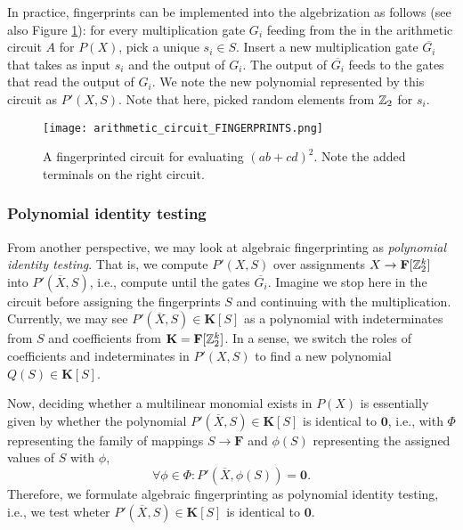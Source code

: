 In practice, fingerprints can be implemented 
into the algebrization as follows (see also Figure \ref{fig:circuit_fingerprints}): 
for every multiplication gate $G_i$ feeding from the
 in the arithmetic circuit $A$ for $P(X)$, 
pick a unique $s_i \in S$. Insert a new multiplication gate $\overbar{G_i}$ that takes 
as input $s_i$ and the output of $G_i$. The output of $\overbar{G_i}$ feeds to the 
gates that read the output of $G_i$. We note the new polynomial represented by this circuit 
as $P'(X, S)$. Note that here, 
\citeauthor{Koutis08} picked random elements from $\mathbb Z_2$ for $s_i$.

\begin{figure}[h]
  \texttt{[image: arithmetic\_circuit\_FINGERPRINTS.png]}
  \centering
  \caption{A fingerprinted circuit for evaluating $(ab+cd)^2$. 
  Note the added terminals on the right circuit.}
  \label{fig:circuit_fingerprints}
\end{figure}

\subsubsection{Polynomial identity testing}

From another perspective, we may look at algebraic fingerprinting as \emph{polynomial identity testing}. 
That is, we compute $P'(X, S)$ over assignments $X \to \mathbf{F}[\mathbb Z_2^k]$ into $P'(\overbar{X}, S)$, i.e., 
compute until the gates $\overbar{G_i}$. 
Imagine we stop here in the circuit before assigning the fingerprints $S$  
and continuing with the multiplication. 
Currently, we may see $P'(\overbar{X}, S) \in \mathbf{K}[S]$ as a polynomial 
with indeterminates from $S$ and coefficients from $\mathbf{K} = \mathbf{F}[\mathbb Z_2^k]$. 
In a sense, we switch the roles of coefficients and indeterminates in $P'(X, S)$ 
to find a new polynomial $Q(S) \in \mathbf{K}[S]$. 

Now, deciding whether a multilinear monomial exists in $P(X)$ is essentially given by 
whether the polynomial $P'(\overbar{X}, S) \in \mathbf{K}[S]$ is identical to $\mathbf{0}$, 
i.e., with $\Phi$ representing the family of mappings $S \to \mathbf{F}$ 
and $\phi(S)$ representing the assigned values of $S$ with $\phi$,  
\[
  \forall \phi \in \Phi %
  \colon P'(\overbar{X}, \phi(S)) = \mathbf{0}.
\]
Therefore, we formulate algebraic fingerprinting as polynomial identity testing, i.e., 
we test wheter $P'(\overbar{X}, S) \in \mathbf{K}[S]$ is identical to $\mathbf{0}$.

